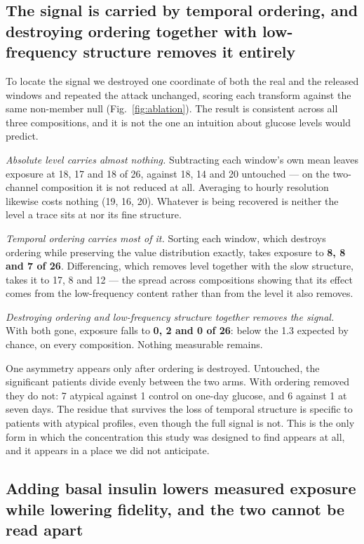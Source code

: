 \documentclass[pdflatex,sn-nature]{sn-jnl}
\theoremstyle{thmstyleone}
\begin{document}
\subsection{The signal is carried by temporal ordering, and destroying ordering
together with low-frequency structure removes it entirely}\label{subsec:mechanism}

To locate the signal we destroyed one coordinate of both the real and the
released windows and repeated the attack unchanged, scoring each transform
against the same non-member null (Fig.~\ref{fig:ablation}). The result is
consistent across all three compositions, and it is not the one an intuition
about glucose levels would predict.

\emph{Absolute level carries almost nothing.} Subtracting each window's own mean
leaves exposure at 18, 17 and 18 of 26, against 18, 14 and 20 untouched --- on
the two-channel composition it is not reduced at all. Averaging to hourly
resolution likewise costs nothing (19, 16, 20). Whatever is being recovered is
neither the level a trace sits at nor its fine structure.

\emph{Temporal ordering carries most of it.} Sorting each window, which destroys
ordering while preserving the value distribution exactly, takes exposure to
\textbf{8, 8 and 7 of 26}. Differencing, which removes level together with the
slow structure, takes it to 17, 8 and 12 --- the spread across compositions
showing that its effect comes from the low-frequency content rather than from
the level it also removes.

\emph{Destroying ordering and low-frequency structure together removes the
signal.} With both gone, exposure falls to \textbf{0, 2 and 0 of 26}: below the
1.3 expected by chance, on every composition. Nothing measurable remains.

One asymmetry appears only after ordering is destroyed. Untouched, the
significant patients divide evenly between the two arms. With ordering removed
they do not: 7 atypical against 1 control on one-day glucose, and 6 against 1 at
seven days. The residue that survives the loss of temporal structure is
specific to patients with atypical profiles, even though the full signal is not.
This is the only form in which the concentration this study was designed to find
appears at all, and it appears in a place we did not anticipate.

\subsection{Adding basal insulin lowers measured exposure while lowering
fidelity, and the two cannot be read apart}\label{subsec:channel}
\end{document}
